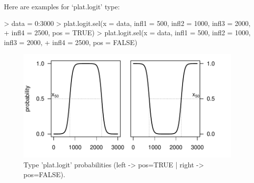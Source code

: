 \documentclass[letterpaper, 12pt]{article}
\begin{document}
Here are examples for `plat.logit' type:
\begin{Schunk}
\begin{Sinput}
> data = 0:3000
> plat.logit.sel(x = data, infl1 = 500, infl2 = 1000, infl3 = 2000, 
+     infl4 = 2500, pos = TRUE)
> plat.logit.sel(x = data, infl1 = 500, infl2 = 1000, infl3 = 2000, 
+     infl4 = 2500, pos = FALSE)
\end{Sinput}
\end{Schunk}
\begin{figure}[h]
\vspace{-20pt}
\begin{center}
\includegraphics{relation_sel-029}
\end{center}
\vspace{-30pt}
\caption{Type 'plat.logit' probabilities (left -> pos=TRUE |  right -> pos=FALSE).}
\vspace{-10pt}
\label{fig14}
\end{figure}
\end{document}
